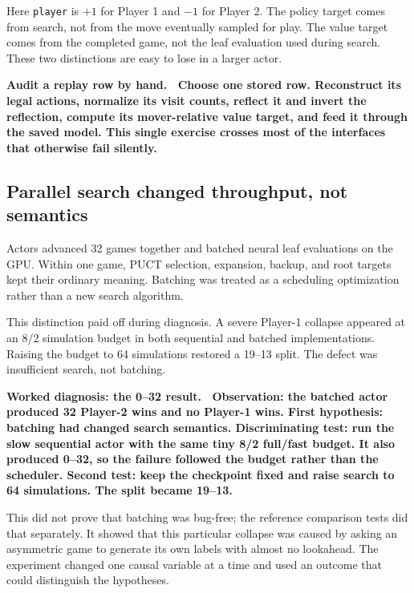 \documentclass[10.5pt,letterpaper]{article}
\newcommand{\boxtitle}[1]{\sffamily\bfseries\color{deepblue}#1.\ }
\newcommand{\code}[1]{\texttt{\small #1}}
\begin{document}
Here \code{player} is $+1$ for Player 1 and $-1$ for Player 2. The policy
target comes from search, not from the move eventually sampled for play. The
value target comes from the completed game, not the leaf evaluation used
during search. These two distinctions are easy to lose in a larger actor.

\begin{plainbox}
\boxtitle{Audit a replay row by hand}
Choose one stored row. Reconstruct its legal actions, normalize its visit
counts, reflect it and invert the reflection, compute its mover-relative value
target, and feed it through the saved model. This single exercise crosses most
of the interfaces that otherwise fail silently.
\end{plainbox}

\subsection{Parallel search changed throughput, not semantics}

Actors advanced 32 games together and batched neural leaf evaluations on the
GPU. Within one game, PUCT selection, expansion, backup, and root targets kept
their ordinary meaning. Batching was treated as a scheduling optimization
rather than a new search algorithm.

This distinction paid off during diagnosis. A severe Player-1 collapse appeared
at an 8/2 simulation budget in both sequential and batched implementations.
Raising the budget to 64 simulations restored a 19--13 split. The defect was
insufficient search, not batching.

\begin{warningbox}
\boxtitle{Worked diagnosis: the 0--32 result}
\textbf{Observation:} the batched actor produced 32 Player-2 wins and no
Player-1 wins. \textbf{First hypothesis:} batching had changed search
semantics. \textbf{Discriminating test:} run the slow sequential actor with the
same tiny 8/2 full/fast budget. It also produced 0--32, so the failure followed
the budget rather than the scheduler. \textbf{Second test:} keep the checkpoint
fixed and raise search to 64 simulations. The split became 19--13.

This did not prove that batching was bug-free; the reference comparison tests
did that separately. It showed that this particular collapse was caused by
asking an asymmetric game to generate its own labels with almost no lookahead.
The experiment changed one causal variable at a time and used an outcome that
could distinguish the hypotheses.
\end{warningbox}
\end{document}

